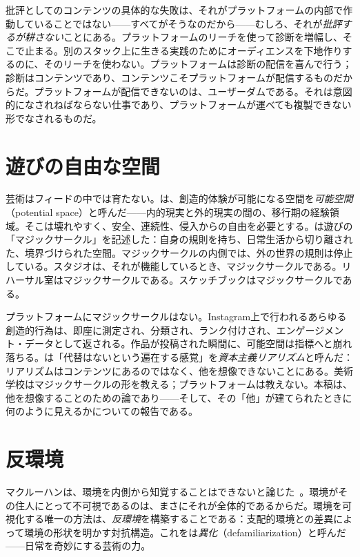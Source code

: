 \documentclass[10pt,letterpaper,twocolumn]{article}
\begin{document}
批評としてのコンテンツの具体的な失敗は、それがプラットフォームの内部で作動していることではない——すべてがそうなのだから——むしろ、それが\emph{批評するが耕さない}ことにある。プラットフォームのリーチを使って診断を増幅し、そこで止まる。別のスタック上に生きる実践のためにオーディエンスを下地作りするのに、そのリーチを使わない。プラットフォームは診断の配信を喜んで行う；診断はコンテンツであり、コンテンツこそプラットフォームが配信するものだからだ。プラットフォームが配信できないのは、ユーザーダムである。それは意図的になされねばならない仕事であり、プラットフォームが運べても複製できない形でなされるものだ。

\section{遊びの自由な空間}

芸術はフィードの中では育たない。\citet{winnicott1971playing}は、創造的体験が可能になる空間を\emph{可能空間}（potential space）と呼んだ——内的現実と外的現実の間の、移行期の経験領域。そこは壊れやすく、安全、連続性、侵入からの自由を必要とする。\citet{huizinga1938homo}は遊びの「マジックサークル」を記述した：自身の規則を持ち、日常生活から切り離された、境界づけられた空間。マジックサークルの内側では、外の世界の規則は停止している。スタジオは、それが機能しているとき、マジックサークルである。リハーサル室はマジックサークルである。スケッチブックはマジックサークルである。

プラットフォームにマジックサークルはない。Instagram上で行われるあらゆる創造的行為は、即座に測定され、分類され、ランク付けされ、エンゲージメント・データとして返される。作品が投稿された瞬間に、可能空間は指標へと崩れ落ちる。\citet{fisher2009capitalist}は「代替はないという遍在する感覚」を\emph{資本主義リアリズム}と呼んだ：リアリズムはコンテンツにあるのではなく、他を想像できないことにある。美術学校はマジックサークルの形を教える；プラットフォームは教えない。本稿は、他を想像することのための論であり——そして、その「他」が建てられたときに何のように見えるかについての報告である。

\section{反環境}

マクルーハンは、環境を内側から知覚することはできないと論じた~\citep{mcluhan1964understanding, mcluhan1969playboy}。環境がその住人にとって不可視であるのは、まさにそれが全体的であるからだ。環境を可視化する唯一の方法は、\emph{反環境}を構築することである：支配的環境との差異によって環境の形状を明かす対抗構造。これを\citet{shklovsky1917art}は\emph{異化}（defamiliarization）と呼んだ——日常を奇妙にする芸術の力。
\end{document}
